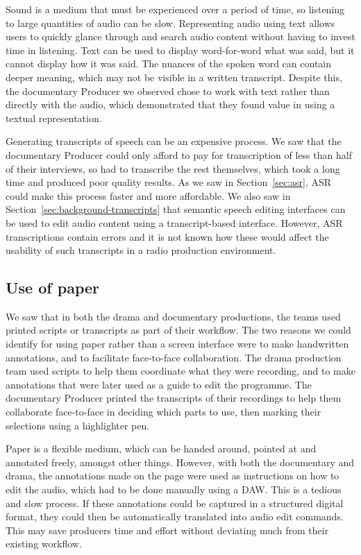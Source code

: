 Sound is a medium that must be experienced over a period of time, so listening to large quantities of audio can be
slow. Representing audio using text allows users to quickly glance through and search audio content without having to
invest time in listening. Text can be used to display word-for-word what was said, but it cannot display how it was
said. The nuances of the spoken word can contain deeper meaning, which may not be visible in a written
transcript. Despite this, the documentary Producer we observed chose to work with text rather than directly with the
audio, which demonstrated that they found value in using a textual representation.

Generating transcripts of speech can be an expensive process. We saw that the documentary Producer could only afford to
pay for transcription of less than half of their interviews, so had to transcribe the rest themselves, which took a
long time and produced poor quality results.  As we saw in Section~\ref{sec:asr}, ASR
could make this process faster and more affordable. We also saw in Section~\ref{sec:background-transcripts} that
semantic speech editing interfaces can be used to edit audio content using a transcript-based interface. However, ASR
transcriptions contain errors and it is not known how these would affect the usability of such transcripts in a radio
production environment.

\subsection{Use of paper}
We saw that in both the drama and documentary productions, the teams used printed scripts or transcripts as part of
their workflow. The two reasons we could identify for using paper rather than a screen interface were to make
handwritten annotations, and to facilitate face-to-face collaboration.  The drama production team used scripts to help
them coordinate what they were recording, and to make annotations that were later used as a guide to edit the
programme. The documentary Producer printed the transcripts of their recordings to help them collaborate face-to-face
in deciding which parts to use, then marking their selections using a highlighter pen.

Paper is a flexible medium, which can be handed around, pointed at and annotated freely, amongst other things.
However, with both the documentary and drama, the annotations made on the page were used as instructions on how to edit
the audio, which had to be done manually using a DAW. This is a tedious and slow process. If these annotations could be
captured in a structured digital format, they could then be automatically translated into audio edit commands. This may
save producers time and effort without deviating much from their existing workflow.

